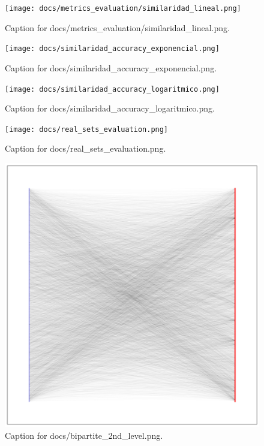 \documentclass{article}
\begin{document}
\begin{figure}[h] \centering \texttt{[image: docs/metrics\_evaluation/similaridad\_lineal.png]} \caption{Caption for docs/metrics_evaluation/similaridad_lineal.png.} \end{figure}
\begin{figure}[h] \centering \texttt{[image: docs/similaridad\_accuracy\_exponencial.png]} \caption{Caption for docs/similaridad_accuracy_exponencial.png.} \end{figure}
\begin{figure}[h] \centering \texttt{[image: docs/similaridad\_accuracy\_logaritmico.png]} \caption{Caption for docs/similaridad_accuracy_logaritmico.png.} \end{figure}
\begin{figure}[h] \centering \texttt{[image: docs/real\_sets\_evaluation.png]} \caption{Caption for docs/real_sets_evaluation.png.} \end{figure}
\begin{figure}[h] \centering \includegraphics{docs/bipartite_2nd_level.png} \caption{Caption for docs/bipartite_2nd_level.png.} \end{figure}
\end{document}
